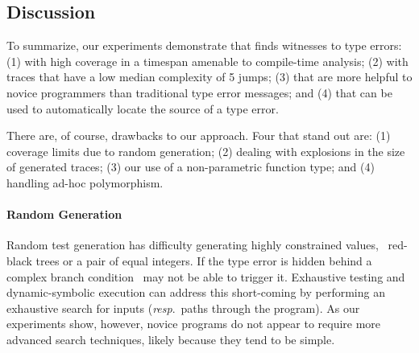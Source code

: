 

\subsection{Discussion}
\label{sec:discussion}

To summarize, our experiments demonstrate that \nanomaly finds witnesses
to type errors:
%
(1) with high coverage in a timespan amenable to compile-time analysis;
%
(2) with traces that have a low median complexity of 5 jumps;
%
(3) that are more helpful to novice programmers than traditional type
error messages; and
%
(4) that can be used to automatically locate the source of a type error.

There are, of course, drawbacks to our approach. Four that stand out
are:
%
(1) coverage limits due to random generation;
%
(2) dealing with explosions in the size of generated traces;
%
(3) our use of a non-parametric function type; and
%
(4) handling ad-hoc polymorphism.

\paragraph{Random Generation}
Random test generation has difficulty generating highly constrained
values, \eg\ red-black trees or a pair of equal integers. If the type
error is hidden behind a complex branch condition \nanomaly\ may not be
able to trigger it. Exhaustive testing and dynamic-symbolic execution
can address this short-coming by performing an exhaustive search for
inputs (\emph{resp}.\ paths through the program). As our experiments
show, however, novice programs do not appear to require more advanced
search techniques, likely because they tend to be simple.


